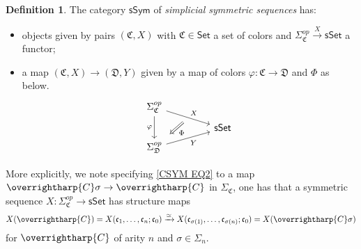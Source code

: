 \documentclass[a4paper,10pt
,draft
]{article}%
\numberwithin{equation}{section}
\numberwithin{figure}{section}
\theoremstyle{definition} %
\newtheorem{definition}[equation]{Definition}%
\newcommand{\vect}[1]{\text{\overrightharp{\ensuremath{#1}}}}
\newcommand{\sSet}{\ensuremath{\mathsf{sSet}}}%
\newcommand{\1}{\ensuremath{\mathbbm 1}}%
\begin{document}
\begin{definition}\label{SSYM DEF}
	The category $\mathsf{sSym}$ of \textit{simplicial symmetric sequences} has:
\begin{itemize}
	\item objects given by pairs
	$(\mathfrak C, X)$ with $\mathfrak{C} \in \mathsf{Set}$
	a set of colors and
	$\Sigma_{\mathfrak C}^{op} \xrightarrow{X}\sSet$
	a functor; 
	\item a map
	$(\mathfrak{C},X) \to (\mathfrak{D},Y)$
	given by a map of colors
	$\varphi \colon \mathfrak{C} \to \mathfrak{D}$
	and $\Phi$ as below.
\begin{equation}
\begin{tikzcd}[row sep = tiny, column sep = 45pt]
	\Sigma_{\mathfrak{C}}^{op} \arrow[dr, "X"{name=U}] 
	\arrow{dd}[swap]{\varphi}
\\
	& \mathsf{sSet}
\\
	|[alias=V]| \Sigma_{\mathfrak{D}}^{op} \arrow[ur, "Y"']
\arrow[Leftarrow, from=V, to=U,shorten >=0.25cm,shorten <=0.25cm, swap,"\Phi"]
\end{tikzcd}
\end{equation}
\end{itemize} 
\end{definition}

More explicitly,
we note specifying \eqref{CSYM EQ2} to a map
$\vect{C} \sigma \to \vect{C}$ in $\Sigma_{\mathfrak{C}}$,
one has that a symmetric sequence
$X \colon \Sigma_{\mathfrak{C}}^{op} \to \mathsf{sSet}$
has structure maps
\begin{equation}\label{SSYMSTMAP EQ}
	X(\vect{C}) = 
	X(\mathfrak c_1, \dots, \mathfrak c_n; \mathfrak c_0) \xrightarrow{\simeq} 
	X(\mathfrak c_{\sigma(1)}, \dots, \mathfrak c_{\sigma(n)}; \mathfrak c_0) =	
	X(\vect{C}\sigma)
\end{equation}
for $\vect{C}$ of arity $n$ and $\sigma \in \Sigma_n$.
\end{document}
